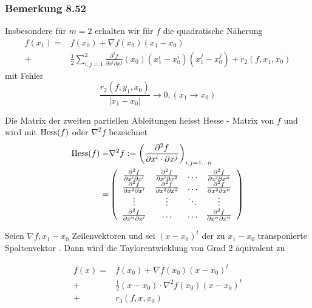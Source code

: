 \subsubsection*{Bemerkung 8.52}
Insbesondere für $m=2$ erhalten wir für $f$ die quadratische Näherung
\begin{align*}
f\left( {{x_1}} \right) = & f\left( {{x_0}} \right) + \nabla f\left( {{x_0}} \right)\left( {{x_1} - {x_0}} \right)\\
 + &\frac{1}{2}\sum\limits_{i,j = 1}^2 {\frac{{{\partial ^2}f}}{{\partial {x^i}\partial {x^j}}}\left( {{x_0}} \right)\left( {x_1^i - x_0^i} \right)} \left( {x_1^j - x_0^j} \right) + {r_2}\left( {f,{x_1},{x_0}} \right)
\end{align*}
mit Fehler
\[\frac{r_2\left( f,y_1,x_0\right)}{\left| x_1-x_0\right|}\to 0, \left( x_1\to x_0\right)\]

\begin{definition}{8.53}
Die Matrix der zweiten partiellen Ableitungen heisst Hesse - Matrix von $f$ und wird mit $\operatorname{Hess}(f)$ oder $\nabla^2 f$ bezeichnet
\begin{align*}
\Hess(f)= & \nabla^2 f:=\left( \frac{\partial^2 f}{\partial x^i\cdot\partial x^j}\right)_{i,j=1\dots n}\\
 = & \left( {\begin{array}{*{20}{c}}
{\frac{{{\partial ^2}f}}{{\partial x'\partial x'}}}&{\frac{{{\partial ^2}f}}{{\partial x'\partial {x^2}}}}& \ldots &{\frac{{{\partial ^2}f}}{{\partial x'\partial {x^n}}}}\\
{\frac{{{\partial ^2}f}}{{\partial {x^2}\partial x'}}}&{\frac{{{\partial ^2}f}}{{\partial {x^2}\partial {x^2}}}}& \ldots &{\frac{{{\partial ^2}f}}{{\partial {x^2}\partial {x^n}}}}\\
 \vdots & \vdots & \ddots & \vdots \\
{\frac{{{\partial ^2}f}}{{\partial {x^n}\partial x'}}}& \ldots & \ldots &{\frac{{{\partial ^2}f}}{{\partial {x^n}\partial {x^n}}}}
\end{array}} \right)
\end{align*}
\end{definition}
Seien $\nabla f,x_1-x_0$ Zeilenvektoren und sei $\left( x-x_0\right)^t$ der zu $x_1-x_0$ transponierte Spaltenvektor . Dann wird die Taylorentwicklung von Grad 2 äquivalent zu

\begin{align*}
f(x) = & f\left( x_0\right) + \nabla f\left( x_0\right) \left( x-x_0\right)^t\\
+ & \frac{1}{2}\left( x-x_0\right)\cdot\nabla^2 f\left( x_0\right)\left( x-x_0\right)^t\\
+ & r_3\left( f,x,x_0\right)
\end{align*}

